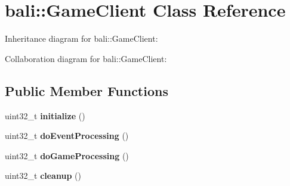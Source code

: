 \hypertarget{classbali_1_1_game_client}{\section{bali\-:\-:Game\-Client Class Reference}
\label{classbali_1_1_game_client}
}


Inheritance diagram for bali\-:\-:Game\-Client\-:


Collaboration diagram for bali\-:\-:Game\-Client\-:
\subsection*{Public Member Functions}
\begin{DoxyCompactItemize}
\item 
\hypertarget{classbali_1_1_game_client_a41f7b69f4305cd8f39722c937b5ee847}{uint32\-\_\-t {\bfseries initialize} ()}\label{classbali_1_1_game_client_a41f7b69f4305cd8f39722c937b5ee847}

\item 
\hypertarget{classbali_1_1_game_client_a689257821fa9450aacb2d89fc06f415e}{uint32\-\_\-t {\bfseries do\-Event\-Processing} ()}\label{classbali_1_1_game_client_a689257821fa9450aacb2d89fc06f415e}

\item 
\hypertarget{classbali_1_1_game_client_a83fda719e0beb26113a38ff9eeea874e}{uint32\-\_\-t {\bfseries do\-Game\-Processing} ()}\label{classbali_1_1_game_client_a83fda719e0beb26113a38ff9eeea874e}

\item 
\hypertarget{classbali_1_1_game_client_a340ac813708105c73b1977b8e49fed7b}{uint32\-\_\-t {\bfseries cleanup} ()}\label{classbali_1_1_game_client_a340ac813708105c73b1977b8e49fed7b}

\end{DoxyCompactItemize}
